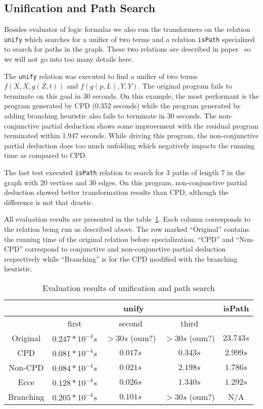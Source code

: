 \subsection{Unification and Path Search}

Besides evaluator of logic formulas we also run the transformers on the relation \lstinline{unify} which searches for a unifier of two terms and a relation \lstinline{isPath} specialized to search for paths in the graph.
These two relations are described in paper~\cite{lozov2019relational} so we will not go into too many details here.

The \lstinline{unify} relation was executed to find a unifier of two terms $f(X, X, g(Z, t))$ and $f(g(p, L), Y, Y)$.
The original \mk{} program fails to terminate on this goal in 30 seconds.
On this example, the most performant is the program generated by CPD (0.352 seconds) while the program generated by adding branching heuristic also fails to terminate in 30 seconds.
The non-conjunctive partial deduction shows some improvement with the residual program terminated within 1.947 seconds.
While driving this program, the non-conjunctive partial deduction does too much unfolding which negatively impacts the running time as compared to CPD.

The last test executed \lstinline{isPath} relation to search for 3 paths of length 7 in the graph with 20 vertices and 30 edges.
On this program, non-conjunctive partial deduction showed better transformation results than CPD, although the difference is not that drastic.

All evaluation results are presented in the table~\ref{tbl:unify}.
Each column corresponds to the relation being run as described above.
The row marked ``Original'' contains the running time of the original \mk{} relation before specialization, ``CPD'' and ``Non-CPD'' correspond to conjunctive and non-conjunctive partial deduction respectively while ``Branching'' is for the CPD modified with the branching heuristic.

\begin{table}
  \centering
  \begin{tabular}{c||c|c|c||c}
                   & \multicolumn{3}{c}{unify} & isPath \\
  \hline
                   & first  & second & third   &        \\
  \hline\hline
  Original         & $0.247*10^{-4}s$ & $>30s$ (oum?) & $>30s$ (oum?) & $23.743s$ \\
  \hline
  CPD              & $0.081*10^{-4}s$ & $0.017s$ & $0.343s$  & $2.999s$  \\
  \hline
  Non-CPD          & $0.084*10^{-4}s$ & $0.021s$ & $2.198s$  & $1.786s$  \\
  \hline
  Ecce             & $0.128*10^{-4}s$ & $0.026s$ & $1.340s$  & $1.292s$ \\
  \hline
  Branching        & $0.205*10^{-4}s$ & $0.101s$ & $>30s$ (oum?) & N/A \\
  \hline
  \end{tabular}

  \caption{Evaluation results of unification and path search}
  \label{tbl:unify}
\end{table}

